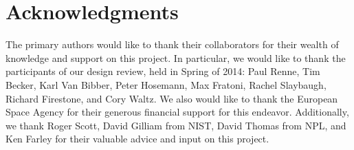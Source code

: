 \documentclass{mc2015}
\begin{document}
 

\section{Acknowledgments}

The primary authors would like to thank their collaborators for their wealth of knowledge and support on this project. In particular, we would like to thank the participants of our design review, held in Spring of 2014: Paul Renne, Tim Becker, Karl Van Bibber, Peter Hosemann, Max Fratoni, Rachel Slaybaugh, Richard Firestone, and Cory Waltz. We also would like to thank the European Space Agency for their generous financial support for this endeavor. Additionally, we thank Roger Scott, David Gilliam from NIST, David Thomas from NPL, and Ken Farley for their valuable advice and input on this project. 

\setlength{\baselineskip}{12pt}




\end{document}

